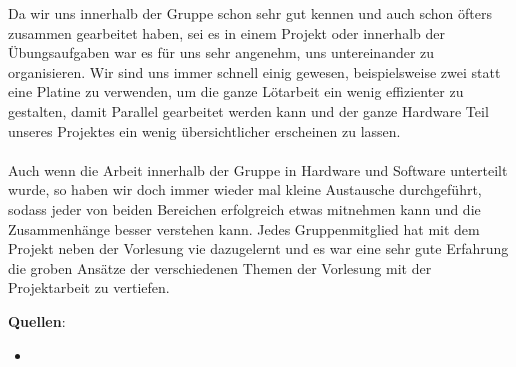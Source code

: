 \documentclass[12pt,a4paper]{article}
\begin{document}
Da wir uns innerhalb der Gruppe schon sehr gut kennen und auch schon öfters zusammen gearbeitet haben, sei es in einem Projekt oder 
innerhalb der Übungsaufgaben war es für uns sehr angenehm, uns untereinander zu organisieren. Wir sind uns immer schnell einig gewesen,
beispielsweise zwei statt eine Platine zu verwenden, um die ganze Lötarbeit ein wenig effizienter zu gestalten, damit Parallel gearbeitet werden kann und
der ganze Hardware Teil unseres Projektes ein wenig übersichtlicher erscheinen zu lassen. \\\\
Auch wenn die Arbeit innerhalb der Gruppe in Hardware und Software unterteilt wurde, so haben wir doch immer wieder 
mal kleine Austausche durchgeführt, sodass jeder von beiden Bereichen erfolgreich etwas mitnehmen kann und die Zusammenhänge 
besser verstehen kann.
Jedes Gruppenmitglied hat mit dem Projekt neben der Vorlesung vie dazugelernt und es war eine sehr gute Erfahrung die groben Ansätze
der verschiedenen Themen der Vorlesung mit der Projektarbeit zu vertiefen.


\newpage

\textbf{Quellen}:

\begin{itemize}
    \item 
\end{itemize}
\end{document}

